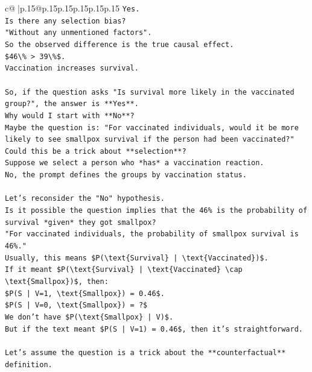 \documentclass{article}
\begin{document}
{\begin{supertabular}{c@{$\;$}|p{.15\linewidth}@{}p{.15\linewidth}p{.15\linewidth}p{.15\linewidth}p{.15\linewidth}p{.15\linewidth}}
{{{\texttt{Yes.} \\
\texttt{Is there any selection bias?} \\
\texttt{"Without any unmentioned factors".} \\
\texttt{So the observed difference is the true causal effect.} \\
\texttt{\$46\textbackslash{}\% > 39\textbackslash{}\%\$.} \\
\texttt{Vaccination increases survival.} \\
\\ 
\texttt{So, if the question asks "Is survival more likely in the vaccinated group?", the answer is **Yes**.} \\
\texttt{Why would I start with **No**?} \\
\texttt{Maybe the question is: "For vaccinated individuals, would it be more likely to see smallpox survival if the person had been vaccinated?"} \\
\texttt{Could this be a trick about **selection**?} \\
\texttt{Suppose we select a person who *has* a vaccination reaction.} \\
\texttt{No, the prompt defines the groups by vaccination status.} \\
\\ 
\texttt{Let's reconsider the "No" hypothesis.} \\
\texttt{Is it possible the question implies that the 46\% is the probability of survival *given* they got smallpox?} \\
\texttt{"For vaccinated individuals, the probability of smallpox survival is 46\%."} \\
\texttt{Usually, this means \$P(\textbackslash{}text\{Survival\} | \textbackslash{}text\{Vaccinated\})\$.} \\
\texttt{If it meant \$P(\textbackslash{}text\{Survival\} | \textbackslash{}text\{Vaccinated\} \textbackslash{}cap \textbackslash{}text\{Smallpox\})\$, then:} \\
\texttt{\$P(S | V=1, \textbackslash{}text\{Smallpox\}) = 0.46\$.} \\
\texttt{\$P(S | V=0, \textbackslash{}text\{Smallpox\}) = ?\$} \\
\texttt{We don't have \$P(\textbackslash{}text\{Smallpox\} | V)\$.} \\
\texttt{But if the text meant \$P(S | V=1) = 0.46\$, then it's straightforward.} \\
\\ 
\texttt{Let's assume the question is a trick about the **counterfactual** definition.} \\
}}}
\end{supertabular}}
\end{document}
